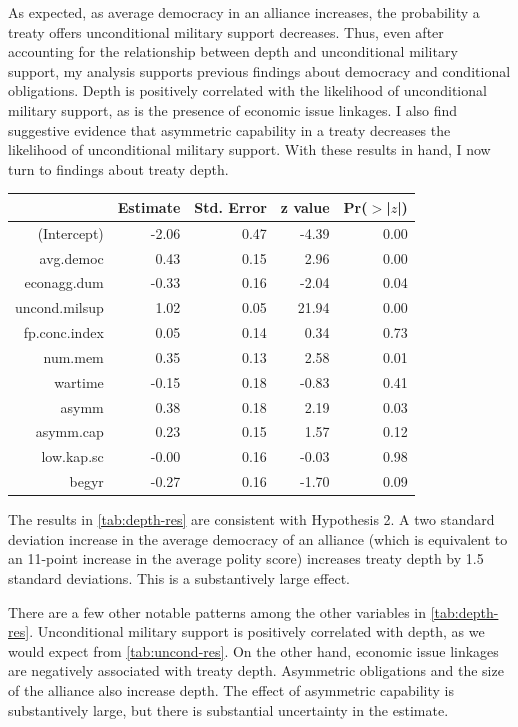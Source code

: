 \documentclass[12pt]{article}
\begin{document}
As expected, as average democracy in an alliance increases, the probability a treaty offers unconditional military support decreases. 
Thus, even after accounting for the relationship between depth and unconditional military support, my analysis supports previous findings about democracy and conditional obligations. 
Depth is positively correlated with the likelihood of unconditional military support, as is the presence of economic issue linkages. 
I also find suggestive evidence that asymmetric capability in a treaty decreases the likelihood of unconditional military support. 
With these results in hand, I now turn to findings about treaty depth. 


\begin{table}[ht]
\centering
\begin{tabular}{rrrrr}
  \hline
 & Estimate & Std. Error & z value & Pr($>$|$z$|) \\ 
  \hline
(Intercept) & -2.06 & 0.47 & -4.39 & 0.00 \\ 
  avg.democ & 0.43 & 0.15 & 2.96 & 0.00 \\ 
  econagg.dum & -0.33 & 0.16 & -2.04 & 0.04 \\ 
  uncond.milsup & 1.02 & 0.05 & 21.94 & 0.00 \\ 
  fp.conc.index & 0.05 & 0.14 & 0.34 & 0.73 \\ 
  num.mem & 0.35 & 0.13 & 2.58 & 0.01 \\ 
  wartime & -0.15 & 0.18 & -0.83 & 0.41 \\ 
  asymm & 0.38 & 0.18 & 2.19 & 0.03 \\ 
  asymm.cap & 0.23 & 0.15 & 1.57 & 0.12 \\ 
  low.kap.sc & -0.00 & 0.16 & -0.03 & 0.98 \\ 
  begyr & -0.27 & 0.16 & -1.70 & 0.09 \\ 
   \hline
\end{tabular}
\label{tab:depth-res}
\end{table}


The results in \autoref{tab:depth-res} are consistent with Hypothesis 2. 
A two standard deviation increase in the average democracy of an alliance (which is equivalent to an 11-point increase in the average polity score) increases treaty depth by 1.5 standard deviations. 
This is a substantively large effect. 


There are a few other notable patterns among the other variables in \autoref{tab:depth-res}. 
Unconditional military support is positively correlated with depth, as we would expect from \autoref{tab:uncond-res}. 
On the other hand, economic issue linkages are negatively associated with treaty depth.
Asymmetric obligations and the size of the alliance also increase depth. 
The effect of asymmetric capability is substantively large, but there is substantial uncertainty in the estimate. 
\end{document}
